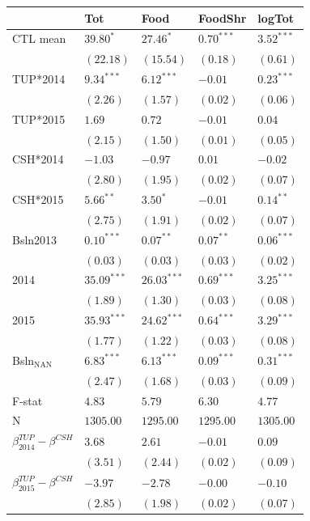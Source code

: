 \documentclass[11pt]{article}
\begin{document}
\begin{center}
\begin{tabular}{lllll}
\hline
 & Tot & Food & FoodShr & logTot\\
\hline
CTL mean & \(39.80^{*}\) & \(27.46^{*}\) & \(0.70^{***}\) & \(3.52^{***}\)\\
 & \((22.18)\) & \((15.54)\) & \(( 0.18)\) & \(( 0.61)\)\\
\hline
TUP*2014 & \(9.34^{***}\) & \(6.12^{***}\) & \(-0.01\) & \(0.23^{***}\)\\
 & \(( 2.26)\) & \(( 1.57)\) & \(( 0.02)\) & \(( 0.06)\)\\
TUP*2015 & \(1.69\) & \(0.72\) & \(-0.01\) & \(0.04\)\\
 & \(( 2.15)\) & \(( 1.50)\) & \(( 0.01)\) & \(( 0.05)\)\\
CSH*2014 & \(-1.03\) & \(-0.97\) & \(0.01\) & \(-0.02\)\\
 & \(( 2.80)\) & \(( 1.95)\) & \(( 0.02)\) & \(( 0.07)\)\\
CSH*2015 & \(5.66^{**}\) & \(3.50^{*}\) & \(-0.01\) & \(0.14^{**}\)\\
 & \(( 2.75)\) & \(( 1.91)\) & \(( 0.02)\) & \(( 0.07)\)\\
Bsln2013 & \(0.10^{***}\) & \(0.07^{**}\) & \(0.07^{**}\) & \(0.06^{***}\)\\
 & \(( 0.03)\) & \(( 0.03)\) & \(( 0.03)\) & \(( 0.02)\)\\
2014 & \(35.09^{***}\) & \(26.03^{***}\) & \(0.69^{***}\) & \(3.25^{***}\)\\
 & \(( 1.89)\) & \(( 1.30)\) & \(( 0.03)\) & \(( 0.08)\)\\
2015 & \(35.93^{***}\) & \(24.62^{***}\) & \(0.64^{***}\) & \(3.29^{***}\)\\
 & \(( 1.77)\) & \(( 1.22)\) & \(( 0.03)\) & \(( 0.08)\)\\
Bsln\(_{\text{NAN}}\) & \(6.83^{***}\) & \(6.13^{***}\) & \(0.09^{***}\) & \(0.31^{***}\)\\
 & \(( 2.47)\) & \(( 1.68)\) & \(( 0.03)\) & \(( 0.09)\)\\
\hline
F-stat & \(4.83\) & \(5.79\) & \(6.30\) & \(4.77\)\\
N & \(1305.00\) & \(1295.00\) & \(1295.00\) & \(1305.00\)\\
\hline
\(\beta^{TUP}_{2014}-\beta^{CSH}\) & \(3.68\) & \(2.61\) & \(-0.01\) & \(0.09\)\\
 & \(( 3.51)\) & \(( 2.44)\) & \(( 0.02)\) & \(( 0.09)\)\\
\(\beta^{TUP}_{2015}-\beta^{CSH}\) & \(-3.97\) & \(-2.78\) & \(-0.00\) & \(-0.10\)\\
 & \(( 2.85)\) & \(( 1.98)\) & \(( 0.02)\) & \(( 0.07)\)\\
\hline
\end{tabular}
\end{center}
\end{document}
